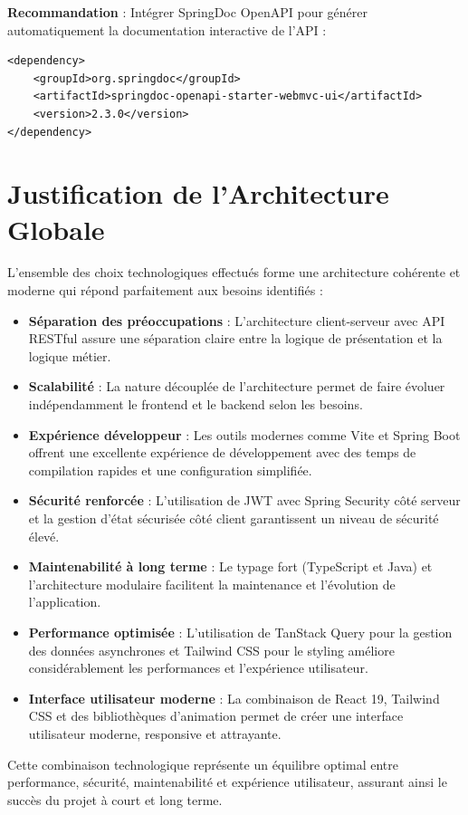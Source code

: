 \textbf{Recommandation} : Intégrer SpringDoc OpenAPI pour générer automatiquement la documentation interactive de l'API :

\begin{verbatim}
<dependency>
    <groupId>org.springdoc</groupId>
    <artifactId>springdoc-openapi-starter-webmvc-ui</artifactId>
    <version>2.3.0</version>
</dependency>
\end{verbatim}

\section{Justification de l'Architecture Globale}

L'ensemble des choix technologiques effectués forme une architecture cohérente et moderne qui répond parfaitement aux besoins identifiés :

\begin{itemize}
    \item \textbf{Séparation des préoccupations} : L'architecture client-serveur avec API RESTful assure une séparation claire entre la logique de présentation et la logique métier.

    \item \textbf{Scalabilité} : La nature découplée de l'architecture permet de faire évoluer indépendamment le frontend et le backend selon les besoins.

    \item \textbf{Expérience développeur} : Les outils modernes comme Vite et Spring Boot offrent une excellente expérience de développement avec des temps de compilation rapides et une configuration simplifiée.

    \item \textbf{Sécurité renforcée} : L'utilisation de JWT avec Spring Security côté serveur et la gestion d'état sécurisée côté client garantissent un niveau de sécurité élevé.

    \item \textbf{Maintenabilité à long terme} : Le typage fort (TypeScript et Java) et l'architecture modulaire facilitent la maintenance et l'évolution de l'application.

    \item \textbf{Performance optimisée} : L'utilisation de TanStack Query pour la gestion des données asynchrones et Tailwind CSS pour le styling améliore considérablement les performances et l'expérience utilisateur.

    \item \textbf{Interface utilisateur moderne} : La combinaison de React 19, Tailwind CSS et des bibliothèques d'animation permet de créer une interface utilisateur moderne, responsive et attrayante.
\end{itemize}

Cette combinaison technologique représente un équilibre optimal entre performance, sécurité, maintenabilité et expérience utilisateur, assurant ainsi le succès du projet à court et long terme.
